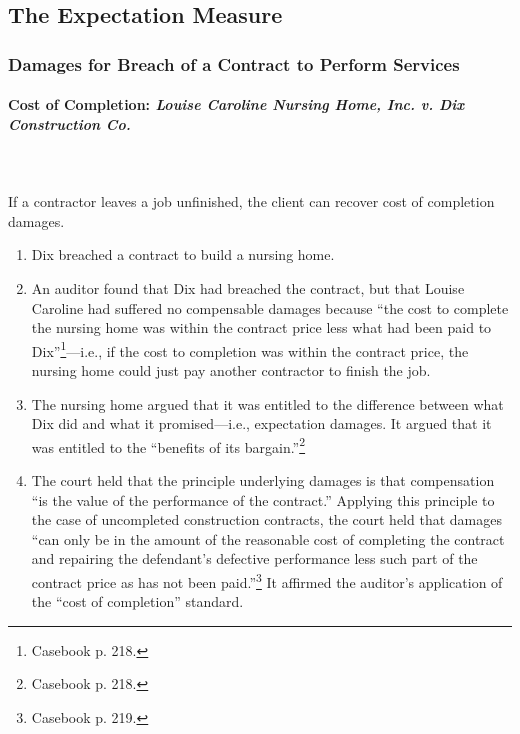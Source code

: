 \subsection{The Expectation Measure}

\subsubsection{Damages for Breach of a Contract to Perform Services}

\paragraph{Cost of Completion: \emph{Louise Caroline Nursing Home, Inc. v. Dix 
Construction Co.}}
~\\\\
If a contractor leaves a job unfinished, the client can recover cost of 
completion damages.

\begin{enumerate}
    \item Dix breached a contract to build a nursing home.
    \item An auditor found that Dix had breached the contract, but that Louise 
    Caroline had suffered no compensable damages because ``the cost to 
    complete the nursing home was within the contract price less what had been 
    paid to Dix''\footnote{Casebook p. 218.}---i.e., if the cost to completion 
    was within the contract price, the nursing home could just pay another 
    contractor to finish the job.
    \item The nursing home argued that it was entitled to the difference 
    between what Dix did and what it promised---i.e., expectation damages. It 
    argued that it was entitled to the ``benefits of its 
    bargain.''\footnote{Casebook p. 218.} 
    \item The court held that the principle underlying damages is that 
    compensation ``is the value of the performance of the contract.'' Applying 
    this principle to the case of uncompleted construction contracts, the 
    court held that damages ``can only be in the amount of the reasonable cost 
    of completing the contract and repairing the defendant's defective 
    performance less such part of the contract price as has not been 
    paid.''\footnote{Casebook p. 219.} It affirmed the auditor's application 
    of the ``cost of completion'' standard.
\end{enumerate}

